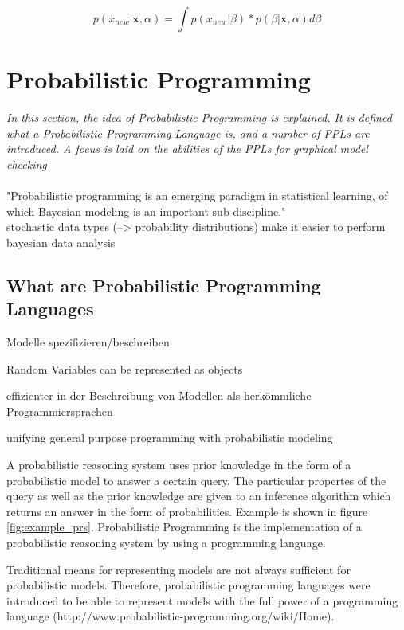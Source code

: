 \documentclass{article}
\begin{document}
\begin{equation}
p(x_{new}|\boldsymbol x, \alpha) = \int p(x_{new}|\beta) * p(\beta | \boldsymbol x,\alpha) d \beta
\label{eq:posterior_predictive}
\end{equation}

\section{Probabilistic Programming}

\textit{In this section,  the idea of Probabilistic Programming is explained. It is defined what a Probabilistic Programming Language is, and a number of PPLs are introduced. A focus is laid on the abilities of the PPLs for graphical model checking}
\\
\\
"Probabilistic programming is an emerging paradigm in statistical learning, of which Bayesian modeling is an important sub-discipline." \cite{Salvatier2016}
\\
stochastic data types (--> probability distributions) make it easier to perform bayesian data analysis

\subsection{What are Probabilistic Programming Languages}

Modelle spezifizieren/beschreiben 

Random Variables can be represented as objects

\cite{wiki:Probabilisticprogramminglanguage}

effizienter in der Beschreibung von Modellen als herkömmliche Programmiersprachen \cite{Hardesty2015}

unifying general purpose programming with probabilistic modeling \cite{probabilistic-programming.org}


A \gls{probabilistic reasoning system} uses prior knowledge in the form of a \gls{probabilistic model} to answer a certain query. The particular propertes of the query as well as the prior knowledge are given to an \gls{inference algorithm} which returns an answer in the form of probabilities. Example is shown in figure \ref{fig:example_prs}. Probabilistic Programming is the implementation of a \gls{probabilistic reasoning system} by using a programming language.

Traditional means for representing models are not always sufficient for probabilistic models. Therefore, probabilistic programming languages were introduced to be able to represent models with the full power of a programming language (http://www.probabilistic-programming.org/wiki/Home).
\end{document}
